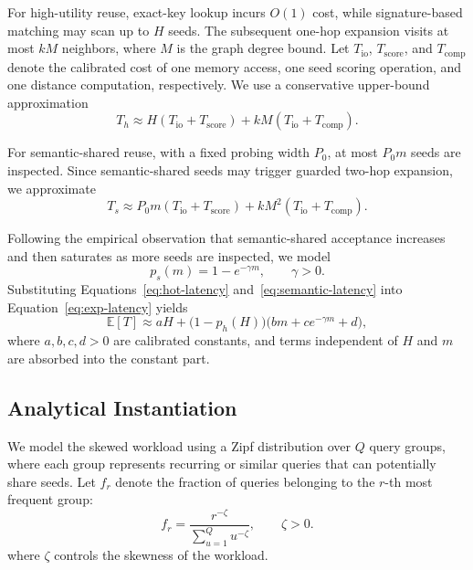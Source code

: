 For high-utility reuse, exact-key lookup incurs $O(1)$ cost, while signature-based matching may scan up to $H$ seeds. The subsequent one-hop expansion visits at most $kM$ neighbors, where $M$ is the graph degree bound.
Let $T_{\mathrm{io}}$, $T_{\mathrm{score}}$, and $T_{\mathrm{comp}}$ denote the calibrated cost of one memory access, one seed scoring operation, and one distance computation, respectively. We use a conservative upper-bound approximation
\begin{equation}
T_h \approx H (T_{\mathrm{io}}+T_{\mathrm{score}}) + kM(T_{\mathrm{io}}+T_{\mathrm{comp}}).
\label{eq:hot-latency}
\end{equation}

For semantic-shared reuse, with a fixed probing width $P_0$, at most $P_0m$ seeds are inspected.
Since semantic-shared seeds may trigger guarded two-hop expansion, we approximate
\begin{equation}
T_s \approx P_0m(T_{\mathrm{io}}+T_{\mathrm{score}})+ kM^2 (T_{\mathrm{io}}+T_{\mathrm{comp}}).
\label{eq:semantic-latency}
\end{equation}

Following the empirical observation that semantic-shared acceptance increases and then saturates as more seeds are inspected, we model
\begin{equation}
p_s(m)=1-e^{-\gamma m}, \qquad \gamma>0.
\end{equation}
Substituting Equations~\eqref{eq:hot-latency} and~\eqref{eq:semantic-latency} into Equation~\eqref{eq:exp-latency} yields
\begin{equation}
\mathbb{E}[T]
\approx
aH+\bigl(1-p_h(H)\bigr)\bigl(bm+ce^{-\gamma m}+d\bigr),
\label{eq:compact-objective}
\end{equation}
where $a,b,c,d>0$ are calibrated constants, and terms independent of $H$ and $m$ are absorbed into the constant part.

\subsection{Analytical Instantiation}
We model the skewed workload using a Zipf distribution over $Q$ query groups, where each group represents recurring or similar queries that can potentially share seeds.
Let $f_r$ denote the fraction of queries belonging to the $r$-th most frequent group:
\begin{equation}
f_r=\frac{r^{-\zeta}}{\sum_{u=1}^{Q}u^{-\zeta}}, \qquad \zeta>0.
\end{equation}
where $\zeta$ controls the skewness of the workload.

